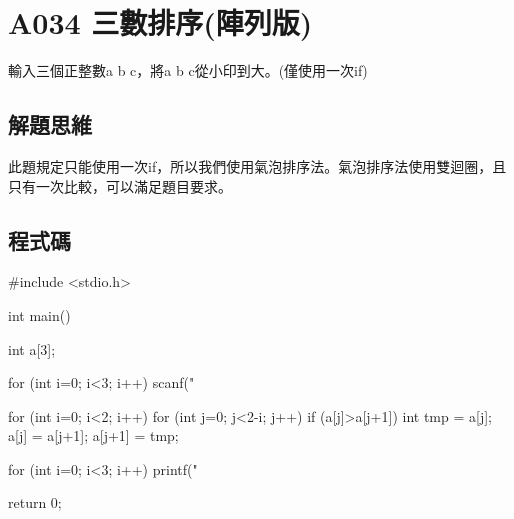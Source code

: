 \section{A034 三數排序(陣列版)}
輸入三個正整數a b c，將a b c從小印到大。(僅使用一次if)
\subsection{解題思維}
	此題規定只能使用一次if，所以我們使用氣泡排序法。氣泡排序法使用雙迴圈，且只有一次比較，可以滿足題目要求。

\subsection{程式碼}
\begin{cppcode}
	#include <stdio.h>
	
	int main()
	{
		int a[3];
		
		for (int i=0; i<3; i++) scanf("%
		
		for (int i=0; i<2; i++) {
			for (int j=0; j<2-i; j++) {
				if (a[j]>a[j+1]) {
					int tmp = a[j];
					a[j] = a[j+1];
					a[j+1] = tmp;
				}
			}
		}
		
		for (int i=0; i<3; i++) printf("%
		
		return 0;
	}
\end{cppcode}
